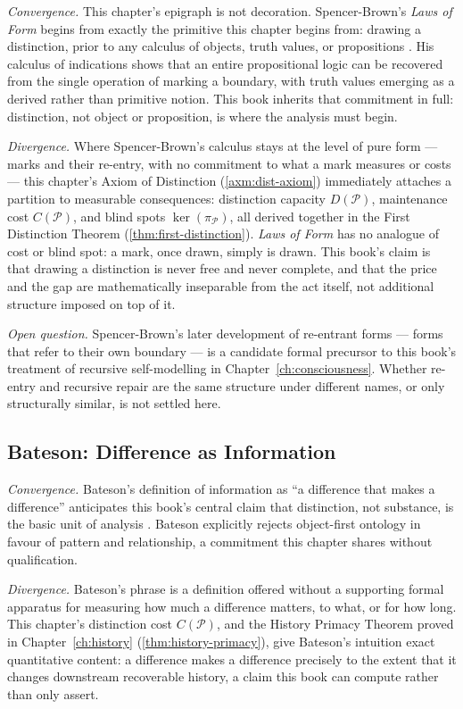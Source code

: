 \documentclass[12pt,twoside,openright]{book}
\newcommand{\partition}{\mathcal{P}}
\begin{document}
\emph{Convergence.} This chapter's epigraph is not decoration.
Spencer-Brown's \emph{Laws of Form} begins from exactly the
primitive this chapter begins from: drawing a distinction,
prior to any calculus of objects, truth values, or
propositions \parencite{spencer-brown1969}. His calculus of
indications shows that an entire propositional logic can be
recovered from the single operation of marking a boundary,
with truth values emerging as a derived rather than primitive
notion. This book inherits that commitment in full: distinction,
not object or proposition, is where the analysis must begin.

\emph{Divergence.} Where Spencer-Brown's calculus stays at the
level of pure form --- marks and their re-entry, with no
commitment to what a mark measures or costs --- this chapter's
Axiom of Distinction (\cref{axm:dist-axiom}) immediately
attaches a partition to measurable consequences: distinction
capacity $D(\partition)$, maintenance cost $C(\partition)$, and
blind spots $\ker(\pi_\partition)$, all derived together in the
First Distinction Theorem (\cref{thm:first-distinction}).
\emph{Laws of Form} has no analogue of cost or blind spot: a
mark, once drawn, simply is drawn. This book's claim is that
drawing a distinction is never free and never complete, and
that the price and the gap are mathematically inseparable from
the act itself, not additional structure imposed on top of it.

\emph{Open question.} Spencer-Brown's later development of
re-entrant forms --- forms that refer to their own boundary ---
is a candidate formal precursor to this book's treatment of
recursive self-modelling in Chapter~\ref{ch:consciousness}.
Whether re-entry and recursive repair are the same structure
under different names, or only structurally similar, is not
settled here.

\subsection*{Bateson: Difference as Information}

\emph{Convergence.} Bateson's definition of information as
``a difference that makes a difference'' anticipates this
book's central claim that distinction, not substance, is the
basic unit of analysis \parencite{bateson1972}. Bateson
explicitly rejects object-first ontology in favour of pattern
and relationship, a commitment this chapter shares without
qualification.

\emph{Divergence.} Bateson's phrase is a definition offered
without a supporting formal apparatus for measuring how much a
difference matters, to what, or for how long. This chapter's
distinction cost $C(\partition)$, and the History Primacy
Theorem proved in Chapter~\ref{ch:history}
(\cref{thm:history-primacy}), give Bateson's intuition exact
quantitative content: a difference makes a difference precisely
to the extent that it changes downstream recoverable history, a
claim this book can compute rather than only assert.
\end{document}
